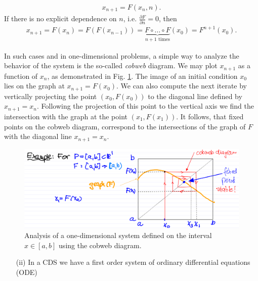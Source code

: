 	\begin{align}
		\boxed{x_{n+1} = F(x_n , n).}	
	\end{align}
	If there is no explicit dependence on $n$, i.e. $\frac{\partial F}{\partial n} = 0$, then 
	\begin{align}
		\boxed{ x_{n+1}= F(x_n) = F(F(x_{n-1})) = \underbrace{F \circ \ldots \circ F}_{n+1 \textrm{ times} }(x_0) = F^{n+1}(x_0).}
	\end{align}

\begin{ex}

	In such cases and in one-dimensional problems, a simple way to analyze the behavior of the system is the so-called {\em cobweb} diagram. We may plot $x_{n+1}$ as a function of $x_{n}$, as demonstrated in Fig. \ref{fig:intro:1}. The image of an initial condition $x_0$ lies on the graph at $x_{n+1}=F(x_0)$. We can also compute the next iterate by vertically projecting the point $(x_0, F(x_0))$ to the diagonal line defined by $x_{n+1}= x_n$. Following the projection of this point to the vertical axis we find the intersection with the graph at the point $(x_1, F(x_1))$.  It follows, that fixed points on the cobweb diagram, correspond to the intersections of the graph of $F$ with the diagonal line $x_{n+1} = x_n$. 
	\end{ex}

	\begin{figure}[H]
	\centering
	\includegraphics[width = \textwidth]{figures/intro/1DDS.png}
	\caption{Analysis of a one-dimensional system defined on the interval $x\in[a,b]$ using the cobweb diagram.}
		\label{fig:intro:1}
\end{figure}
\begin{enumerate}
\item[(ii)] In a CDS we have a first order system of ordinary differential equations (ODE)
\end{enumerate}

